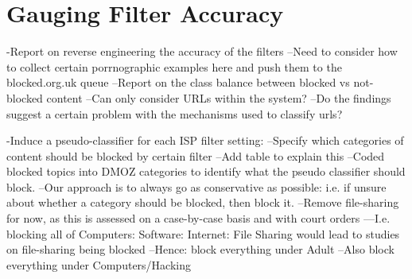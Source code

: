 \documentclass{bmcart}
\begin{document}
\clearpage
\section*{Gauging Filter Accuracy}
-Report on reverse engineering the accuracy of the filters
--Need to consider how to collect certain porrnographic examples here and push them to the blocked.org.uk queue
--Report on the class balance between blocked vs not-blocked content
--Can only consider URLs within the system?
--Do the findings suggest a certain problem with the mechanisms used to classify urls?

-Induce a pseudo-classifier for each ISP filter setting:
--Specify which categories of content should be blocked by certain filter
--Add table to explain this
--Coded blocked topics into DMOZ categories to identify what the pseudo classifier should block. 
--Our approach is to always go as conservative as possible: i.e. if unsure about whether a category should be blocked, then block it.
--Remove file-sharing for now, as this is assessed on a case-by-case basis and with court orders
---I.e. blocking all of Computers: Software: Internet: File Sharing would lead to studies on file-sharing being blocked
--Hence: block everything under Adult
--Also block everything under Computers/Hacking

%
%
%
\end{document}
